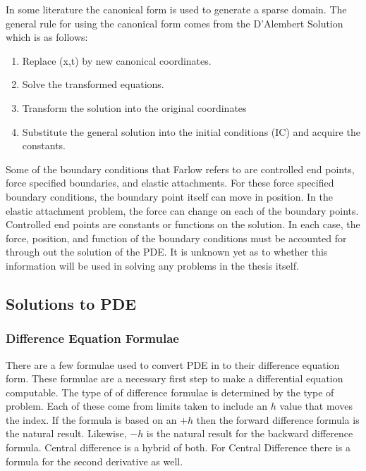 
In some literature the canonical form is used to generate a sparse domain.  The general rule for using the canonical form comes from the D'Alembert Solution which is as follows:
\begin{enumerate}
\item Replace (x,t) by new canonical coordinates.
\item Solve the transformed equations.
\item Transform the solution into the original coordinates
\item Substitute the general solution into the initial conditions (IC) and %
 acquire the constants. 
\end{enumerate}




 

Some of the boundary conditions that Farlow \cite{PDEfSE} refers to are controlled end points, force specified boundaries, and elastic attachments.  For these force specified boundary conditions, %
 the boundary point itself can move in position.  In the elastic attachment problem, the force can change on each of the boundary points.  %
Controlled end points are constants or functions on the solution.   
In each case, the force, position, and function of the boundary conditions must be accounted for through out the solution of the PDE.   It is unknown yet as to whether this information will be used in solving any problems in the thesis itself.  

\subsection {Solutions to PDE}

\subsubsection {Difference Equation Formulae}
There are a few formulae used to convert PDE in to their difference equation form.    These formulae are a necessary first step to make a differential equation computable.  The type of of difference formulae is determined by the type of problem.   Each of these come from limits taken to include an $h$ value that moves the index.  If the formula is based on an $+h$ then the forward difference formula is the natural result.  Likewise, $-h$ is the natural result for the backward difference formula.  Central difference is a hybrid of both.  For Central Difference there is a formula for the second derivative as well.  

